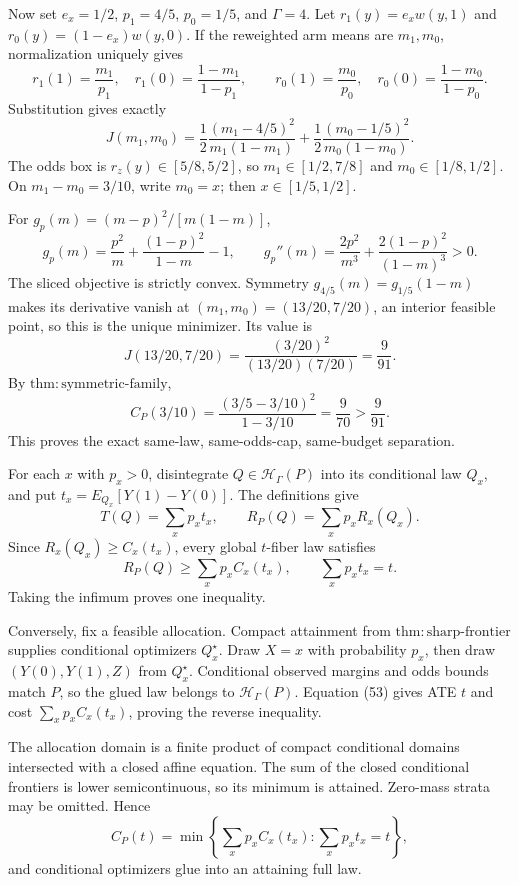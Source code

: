 Now set \(e_x=1/2\), \(p_1=4/5\), \(p_0=1/5\), and \(\Gamma=4\). Let \(r_1(y)=e_xw(y,1)\) and \(r_0(y)=(1-e_x)w(y,0)\). If the reweighted arm means are \(m_1,m_0\), normalization uniquely gives
\[
r_1(1)=\frac{m_1}{p_1},\quad r_1(0)=\frac{1-m_1}{1-p_1},\qquad
r_0(1)=\frac{m_0}{p_0},\quad r_0(0)=\frac{1-m_0}{1-p_0}. \tag{48}
\]
Substitution gives exactly
\[
J(m_1,m_0)
=\frac12\frac{(m_1-4/5)^2}{m_1(1-m_1)}
+\frac12\frac{(m_0-1/5)^2}{m_0(1-m_0)}. \tag{49}
\]
The odds box is \(r_z(y)\in[5/8,5/2]\), so \(m_1\in[1/2,7/8]\) and \(m_0\in[1/8,1/2]\). On \(m_1-m_0=3/10\), write \(m_0=x\); then \(x\in[1/5,1/2]\).

For \(g_p(m)=(m-p)^2/[m(1-m)]\),
\[
g_p(m)=\frac{p^2}{m}+\frac{(1-p)^2}{1-m}-1,\qquad
g_p''(m)=\frac{2p^2}{m^3}+\frac{2(1-p)^2}{(1-m)^3}>0. \tag{50}
\]
The sliced objective is strictly convex. Symmetry \(g_{4/5}(m)=g_{1/5}(1-m)\) makes its derivative vanish at \((m_1,m_0)=(13/20,7/20)\), an interior feasible point, so this is the unique minimizer. Its value is
\[
J(13/20,7/20)=\frac{(3/20)^2}{(13/20)(7/20)}=\frac9{91}. \tag{51}
\]
By \(\mathrm{thm{:}symmetric\mbox{-}family}\),
\[
C_P(3/10)=\frac{(3/5-3/10)^2}{1-3/10}=\frac9{70}>\frac9{91}. \tag{52}
\]
This proves the exact same-law, same-odds-cap, same-budget separation.

For each \(x\) with \(p_x>0\), disintegrate \(Q\in\mathcal H_\Gamma(P)\) into its conditional law \(Q_x\), and put \(t_x=E_{Q_x}[Y(1)-Y(0)]\). The definitions give
\[
T(Q)=\sum_xp_xt_x,\qquad R_P(Q)=\sum_xp_xR_x(Q_x). \tag{53}
\]
Since \(R_x(Q_x)\geq C_x(t_x)\), every global \(t\)-fiber law satisfies
\[
R_P(Q)\geq\sum_xp_xC_x(t_x),\qquad \sum_xp_xt_x=t. \tag{54}
\]
Taking the infimum proves one inequality.

Conversely, fix a feasible allocation. Compact attainment from \(\mathrm{thm{:}sharp\mbox{-}frontier}\) supplies conditional optimizers \(Q_x^\star\). Draw \(X=x\) with probability \(p_x\), then draw \((Y(0),Y(1),Z)\) from \(Q_x^\star\). Conditional observed margins and odds bounds match \(P\), so the glued law belongs to \(\mathcal H_\Gamma(P)\). Equation (53) gives ATE \(t\) and cost \(\sum_xp_xC_x(t_x)\), proving the reverse inequality.

The allocation domain is a finite product of compact conditional domains intersected with a closed affine equation. The sum of the closed conditional frontiers is lower semicontinuous, so its minimum is attained. Zero-mass strata may be omitted. Hence
\[
C_P(t)=\min\left\{\sum_xp_xC_x(t_x):\sum_xp_xt_x=t\right\},
\]
and conditional optimizers glue into an attaining full law.

